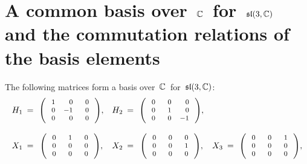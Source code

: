 
\section{A common basis over \,$\mathbb{C}$\, for \,$\mathfrak{sl}(3,\mathbb{C})$\, and the commutation relations of the basis elements}


\begin{lemma}
\mbox{}
\vskip 0.05cm
\noindent
The following matrices form a basis over \,$\mathbb{C}$\, for 
\,$\mathfrak{sl}(3,\mathbb{C})$:
\begin{equation*}
\begin{array}{ccccccccc}
H_{1}
\!\!\!
&=&
    \!\!
    {\footnotesize\left(\,
        \begin{array}{rrr} 1 & 0 & {\color{white}..}0 \\ 0 & -1 & 0 \\ 0 & 0 & 0 \end{array}
        \,\right)},
&
H_{2}
\!\!\!
&=&
    \!\!
    {\footnotesize\left(\,
        \begin{array}{rrr} 0 & {\color{white}..}0 & 0 \\ 0 & 1 & 0 \\ 0 & 0 & -1 \end{array}
        \,\right)},
\\ \\
X_{1}
\!\!\!
&=&
    \!\!
    {\footnotesize\left(\,
        \begin{array}{rrr} 0 & {\color{white}..}1 & {\color{white}..}0 \\ 0 & 0 & 0 \\ 0 & 0 & 0 \end{array}
        \,\right)},
&
X_{2}
\!\!\!
&=&
    \!\!
    {\footnotesize\left(\,
        \begin{array}{rrr} 0 & {\color{white}..}0 & {\color{white}..}0 \\ 0 & 0 & 1 \\ 0 & 0 & 0 \end{array}
        \,\right)},
&
X_{3}
\!\!\!
&=&
    \!\!
    {\footnotesize\left(\,
        \begin{array}{rrr} 0 & {\color{white}..}0 & {\color{white}..}1 \\ 0 & 0 & 0 \\ 0 & 0 & 0 \end{array}
        \,\right)},
\\ \\

\end{array}
\end{equation*}
\end{lemma}

